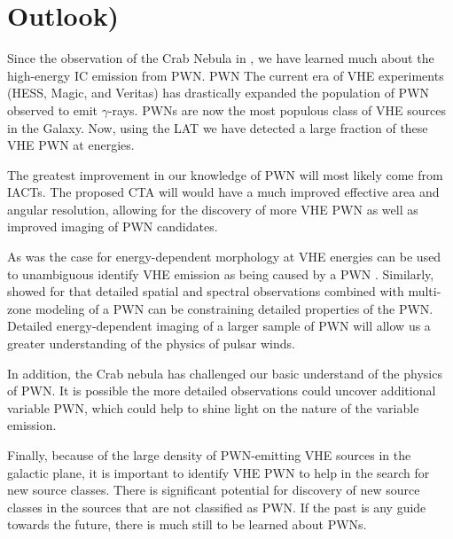 \chapter{Outlook)}

Since the observation of the Crab Nebula
in \citeyear{weekes_1989a_observation-gamma}
\cite{weekes_1989a_observation-gamma}, we have learned much about the
high-energy \ac{IC} emission from \ac{PWN}. \ac{PWN} The current era of
\ac{VHE} experiments (\ac{HESS}, Magic, and Veritas) has drastically
expanded the population of \ac{PWN} observed to emit $\gamma$-rays.
\acp{PWN} are now the most populous class of \ac{VHE} sources in the
Galaxy.  Now, using the \ac{LAT} we have detected a large fraction of
these \ac{VHE} \ac{PWN} at \gev energies.

The greatest improvement in our knowledge of \ac{PWN}
will most likely come from \acp{IACT}. The proposed \ac{CTA}
\citep{actis_2011a_design-concepts} will would have a much improved
effective area and angular resolution, allowing for the discovery of
more \ac{VHE} \ac{PWN} as well as improved imaging of \ac{PWN} candidates.

As was the case for  energy-dependent morphology at \ac{VHE}
energies can be used to unambiguous identify \ac{VHE} emission as being
caused by a \ac{PWN} \citep{aharonian_2006a_energy-dependent}.  Similarly,
\cite{van-etten_2011a_multi-zone-modeling} showed for  that
detailed spatial and spectral observations combined with multi-zone
modeling of a \ac{PWN} can be constraining detailed properties of
the \ac{PWN}.  Detailed energy-dependent imaging of a larger sample
of \ac{PWN} will allow us a greater understanding of the physics of
pulsar winds.

In addition, the Crab nebula has challenged our basic understand of the
physics of \ac{PWN}. It is possible the more detailed observations could
uncover additional variable \ac{PWN}, which could help to shine light
on the nature of the variable emission.

Finally, because of the large density of \ac{PWN}-emitting \ac{VHE}
sources in the galactic plane, it is important to identify \ac{VHE}
\ac{PWN} to help in the search for new source classes.  There is
significant potential for discovery of new source classes in the sources
that are not classified as \ac{PWN}.  If the past is any guide towards
the future, there is much still to be learned about \acp{PWN}.
